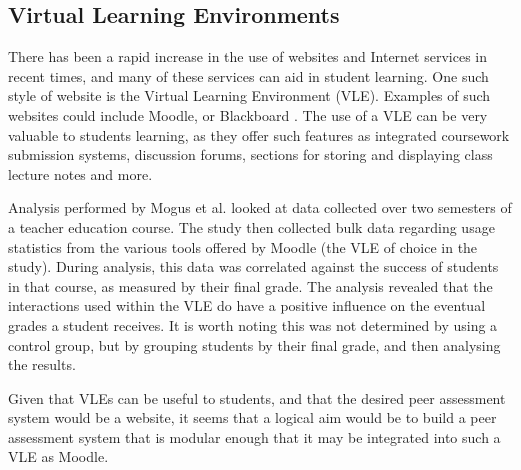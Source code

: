 \documentclass[a4paper,11pt]{report}
\begin{document}
\subsection{Virtual Learning Environments}
\label{subsec:vle}
There has been a rapid increase in the use of websites and Internet services in recent times, and many of these services can aid in student learning. One such style of website is the Virtual Learning Environment (VLE). Examples of such websites could include Moodle, \cite{moodle_about_2016} or Blackboard \cite{blackboard_blackboard_2016}. The use of a VLE can be very valuable to students learning, as they offer such features as integrated coursework submission systems, discussion forums, sections for storing and displaying class lecture notes and more.\par
Analysis performed by Mogus et al. \cite{mogus_impact_2012} looked at data collected over two semesters of a teacher education course. The study then collected bulk data regarding usage statistics from the various tools offered by Moodle (the VLE of choice in the study). During analysis, this data was correlated against the success of students in that course, as measured by their final grade. The analysis 
revealed that the interactions used within the VLE do have a positive influence on the eventual grades a student receives. It is worth noting this was not determined by using a control group, but by grouping students by their final grade, and then analysing the results.\par
Given that VLEs can be useful to students, and that the desired peer assessment system would be a website, it seems that a logical aim would be to build a peer assessment system that is modular enough that it may be integrated into such a VLE as Moodle.\par
\end{document}
